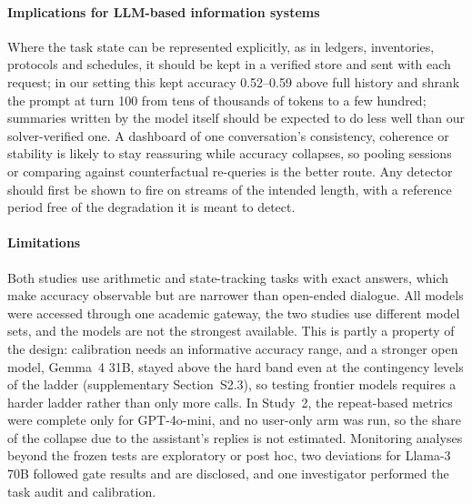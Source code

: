 \paragraph{Implications for LLM-based information systems}
Where the task state can be represented explicitly, as in ledgers,
inventories, protocols and schedules, it should be kept in a verified store and
sent with each request; in our setting this kept accuracy 0.52--0.59 above full
history and shrank the prompt at turn 100 from tens of thousands of tokens to a
few hundred; summaries written by the model itself should be expected to do
less well than our solver-verified one. A dashboard of one conversation's
consistency, coherence or stability is likely to stay reassuring while accuracy
collapses, so pooling sessions or comparing against counterfactual re-queries
is the better route. Any detector should first be shown to fire on streams of
the intended length, with a reference period free of the degradation it is
meant to detect.

\paragraph{Limitations}
Both studies use arithmetic and state-tracking tasks with exact answers, which
make accuracy observable but are narrower than open-ended dialogue. All models
were accessed through one academic gateway, the two studies use different
model sets, and the models are not the strongest available. This is partly a
property of the design: calibration needs an informative accuracy range, and
a stronger open model, Gemma~4 31B, stayed above the hard band even at the
contingency levels of the ladder (supplementary
Section~S2.3), so testing frontier models requires a
harder ladder rather than only more calls. In Study~2, the repeat-based
metrics were complete only for GPT-4o-mini, and no user-only arm was run, so
the share of the collapse due to the assistant's replies is not estimated.
Monitoring analyses beyond the frozen tests are exploratory or post hoc, two
deviations for Llama-3 70B followed gate results and are disclosed, and one
investigator performed the task audit and calibration.

